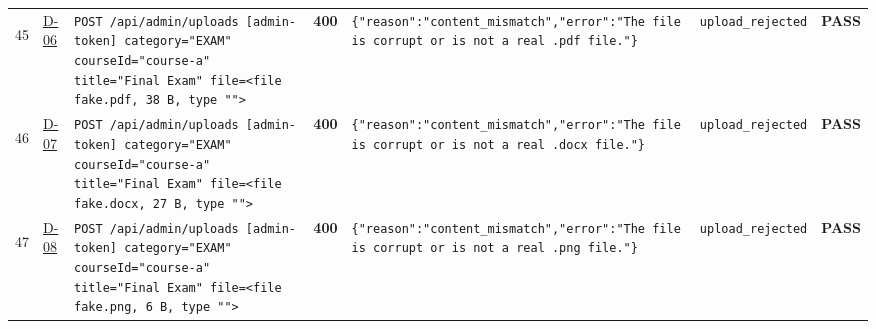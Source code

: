 \documentclass[10pt,a4paper]{article}
\begin{document}
\begin{landscape}
\begin{longtable}{@{}P{0.6cm}P{0.9cm}P{8.5cm}P{1.0cm}P{6.2cm}P{4.2cm}P{1.1cm}@{}}
\hypertarget{call45}{45} & \hyperlink{test-D-06}{D-06} & \texttt{POST /\allowbreak{}api/\allowbreak{}admin/\allowbreak{}uploads [admin-\allowbreak{}token] category=\allowbreak{}"\allowbreak{}EXAM"\allowbreak{} courseId=\allowbreak{}"\allowbreak{}course-\allowbreak{}a"\allowbreak{} title=\allowbreak{}"\allowbreak{}Final Exam"\allowbreak{} file=\allowbreak{}<file fake.\allowbreak{}pdf,\allowbreak{} 38 B,\allowbreak{} type "\allowbreak{}"\allowbreak{}>} & \textcolor{warnamber}{\textbf{400}} & \texttt{\{"\allowbreak{}reason"\allowbreak{}:\allowbreak{}"\allowbreak{}content\_\allowbreak{}mismatch"\allowbreak{},\allowbreak{}"\allowbreak{}error"\allowbreak{}:\allowbreak{}"\allowbreak{}The file is corrupt or is not a real .\allowbreak{}pdf file.\allowbreak{}"\allowbreak{}\}} & \texttt{upload\_\allowbreak{}rejected} & \textcolor{passgreen}{\textbf{PASS}} \\
\hypertarget{call46}{46} & \hyperlink{test-D-07}{D-07} & \texttt{POST /\allowbreak{}api/\allowbreak{}admin/\allowbreak{}uploads [admin-\allowbreak{}token] category=\allowbreak{}"\allowbreak{}EXAM"\allowbreak{} courseId=\allowbreak{}"\allowbreak{}course-\allowbreak{}a"\allowbreak{} title=\allowbreak{}"\allowbreak{}Final Exam"\allowbreak{} file=\allowbreak{}<file fake.\allowbreak{}docx,\allowbreak{} 27 B,\allowbreak{} type "\allowbreak{}"\allowbreak{}>} & \textcolor{warnamber}{\textbf{400}} & \texttt{\{"\allowbreak{}reason"\allowbreak{}:\allowbreak{}"\allowbreak{}content\_\allowbreak{}mismatch"\allowbreak{},\allowbreak{}"\allowbreak{}error"\allowbreak{}:\allowbreak{}"\allowbreak{}The file is corrupt or is not a real .\allowbreak{}docx file.\allowbreak{}"\allowbreak{}\}} & \texttt{upload\_\allowbreak{}rejected} & \textcolor{passgreen}{\textbf{PASS}} \\
\hypertarget{call47}{47} & \hyperlink{test-D-08}{D-08} & \texttt{POST /\allowbreak{}api/\allowbreak{}admin/\allowbreak{}uploads [admin-\allowbreak{}token] category=\allowbreak{}"\allowbreak{}EXAM"\allowbreak{} courseId=\allowbreak{}"\allowbreak{}course-\allowbreak{}a"\allowbreak{} title=\allowbreak{}"\allowbreak{}Final Exam"\allowbreak{} file=\allowbreak{}<file fake.\allowbreak{}png,\allowbreak{} 6 B,\allowbreak{} type "\allowbreak{}"\allowbreak{}>} & \textcolor{warnamber}{\textbf{400}} & \texttt{\{"\allowbreak{}reason"\allowbreak{}:\allowbreak{}"\allowbreak{}content\_\allowbreak{}mismatch"\allowbreak{},\allowbreak{}"\allowbreak{}error"\allowbreak{}:\allowbreak{}"\allowbreak{}The file is corrupt or is not a real .\allowbreak{}png file.\allowbreak{}"\allowbreak{}\}} & \texttt{upload\_\allowbreak{}rejected} & \textcolor{passgreen}{\textbf{PASS}} \\

\end{longtable}
\end{landscape}
\end{document}
